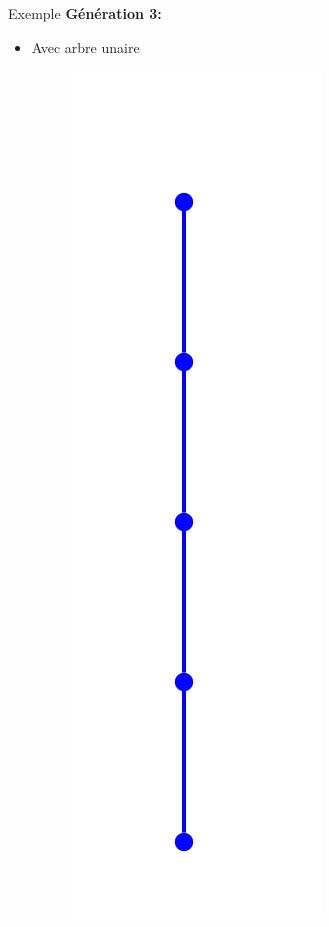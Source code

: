\documentclass{beamer}
\begin{document}
\begin{frame}{Exemple}
\textbf{Génération 3:}\\
\begin{itemize}
\item  Avec arbre unaire
\begin{figure}[h]
  \centering
  \includegraphics[scale=0.17]{gen3-1.png}
\end{figure}
\end{itemize}
\end{frame}
\end{document}
